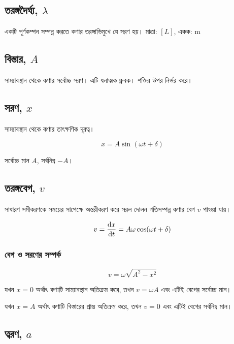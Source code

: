 \subsection{তরঙ্গদৈর্ঘ্য, $\lambda$}

একটি পূর্ণকম্পন সম্পন্ন করতে কণার তরঙ্গাভিমুখে যে সরণ হয়। মাত্রা: $[L]$, একক: \textenglish{m}

\subsection{বিস্তার, $A$}

সাম্যাবস্থান থেকে কণার সর্বোচ্চ সরণ। এটি ধনাত্মক ধ্রুবক। শক্তির উপর নির্ভর করে।

\subsection{সরণ, $x$}

সাম্যাবস্থান থেকে কণার তাৎক্ষণিক দূরত্ব।

\begin{equation}
    x = A \sin(\omega t + \delta)
\end{equation}

সর্বোচ্চ মান $A$, সর্বনিম্ন $-A$।

\subsection{তরঙ্গবেগ, $v$}

সাধারণ সমীকরণকে সময়ের সাপেক্ষে অন্তরীকরণ করে সরল দোলন গতিসম্পন্ন কণার বেগ $v$ পাওয়া যায়।

\begin{equation}
    v = \dv{x}{t} = A\omega \cos(\omega t + \delta)
\end{equation}

\subsubsection{বেগ ও সরণের সম্পর্ক}

\begin{equation}
    v = \omega\sqrt{A^2 - x^2}
\end{equation}

যখন $x = 0$ অর্থাৎ কণাটি সাম্যাবস্থান অতিক্রম করে, তখন $v = \omega A$ এবং এটিই বেগের সর্বোচ্চ মান।

যখন $x = A$ অর্থাৎ কণাটি বিস্তারের প্রান্ত অতিক্রম করে, তখন $v = 0$ এবং এটিই বেগের সর্বনিম্ন মান।

\subsection{ত্বরণ, $a$}

